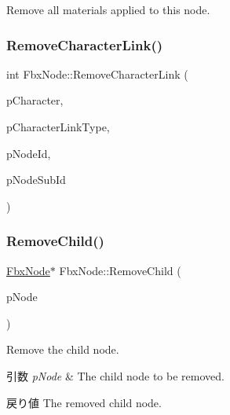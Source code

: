 Remove all materials applied to this node. \mbox{\label{class_fbx_node_ace2096451cb7e54375da497d1004b30b}} 
\subsubsection{\texorpdfstring{Remove\+Character\+Link()}{RemoveCharacterLink()}}
{\footnotesize\ttfamily int Fbx\+Node\+::\+Remove\+Character\+Link (\begin{DoxyParamCaption}\item[{\hyperlink{class_fbx_character}{Fbx\+Character} $\ast$}]{p\+Character,  }\item[{int}]{p\+Character\+Link\+Type,  }\item[{int}]{p\+Node\+Id,  }\item[{int}]{p\+Node\+Sub\+Id }\end{DoxyParamCaption})}

\mbox{\label{class_fbx_node_ad2c979aa18554c574b147dffe72a0c98}} 
\subsubsection{\texorpdfstring{Remove\+Child()}{RemoveChild()}}
{\footnotesize\ttfamily \hyperlink{class_fbx_node}{Fbx\+Node}$\ast$ Fbx\+Node\+::\+Remove\+Child (\begin{DoxyParamCaption}\item[{\hyperlink{class_fbx_node}{Fbx\+Node} $\ast$}]{p\+Node }\end{DoxyParamCaption})}

Remove the child node. 
\begin{DoxyParams}{引数}
{\em p\+Node} & The child node to be removed. \\
\hline
\end{DoxyParams}
\begin{DoxyReturn}{戻り値}
The removed child node. 
\end{DoxyReturn}
\mbox{\label{class_fbx_node_a9c02b146acb71731466cc55306c30d60}} 
